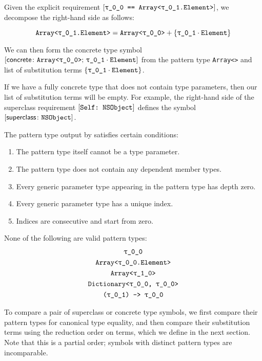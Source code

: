 \documentclass[../generics]{subfiles}
\begin{document}
\begin{example}
Given the explicit requirement $\SameReq{\rT}{Array<\rU.Element>}$, we decompose the right-hand side as follows:
\begin{ceqn}
\[\texttt{Array<\rU.Element>} = \texttt{Array<\rT>} + \{\rU\cdot\nElement\}\]
\end{ceqn}
We can then form the concrete type symbol $\concretesym{\texttt{Array<\rT>};\, \rU\cdot\nElement}$ from the pattern type \texttt{Array<\rT>} and list of substitution terms $\{\rU\cdot\nElement\}$.
\end{example}

\begin{example}
If we have a fully concrete type that does not contain type parameters, then our list of substitution terms will be empty. For example, the right-hand side of the superclass requirement $[\texttt{Self:~NSObject}]$ defines the symbol $[\mathsf{superclass}\colon \texttt{NSObject}]$.
\end{example}

\begin{example}
The pattern type output by  satisfies certain conditions:
\begin{enumerate}
\item The pattern type itself cannot be a type parameter.
\item The pattern type does not contain any dependent member types.
\item Every generic parameter type appearing in the pattern type has depth zero.
\item Every generic parameter type has a unique index.
\item Indices are consecutive and start from zero.
\end{enumerate}
None of the following are valid pattern types:
\begin{gather*}
\rT\\
\texttt{Array<\rT.Element>}\\
\texttt{Array<\ttgp{1}{0}>}\\
\texttt{Dictionary<\rT,~\rT>}\\
\texttt{(\rU) -> \rT}
\end{gather*}
\end{example}
To compare a pair of superclass or concrete type symbols, we first compare their pattern types for canonical type equality, and then compare their substitution terms using the reduction order on terms, which we define in the next section. Note that this is a partial order; symbols with distinct pattern types are incomparable.
\end{document}
